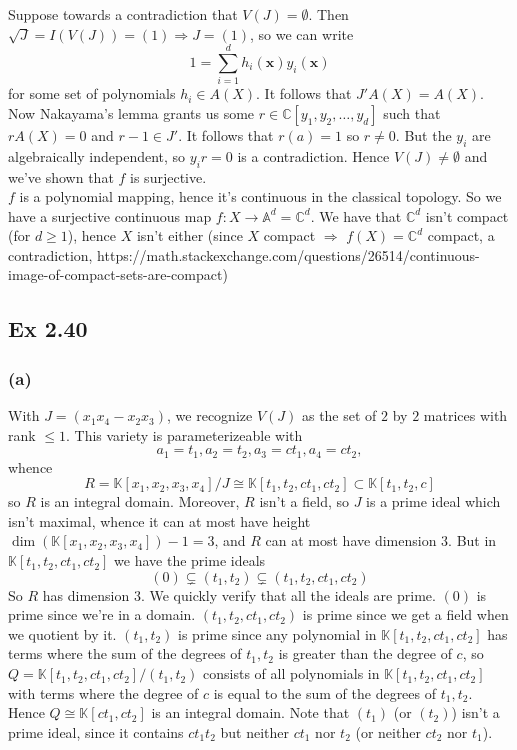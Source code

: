 \documentclass{article}
\theoremstyle{definition}
\newcommand{\C}{\mathbb{C}}
\newcommand{\K}{\mathbb{K}}
\newcommand{\A}{\mathbb{A}}
\newcommand{\x}{\bm{x}}
\begin{document}
Suppose towards a contradiction that $V(J) = \emptyset$. Then $\sqrt{J} =
I(V(J)) = (1) \Rightarrow J = (1)$, so we can write 
\[
	1 = \sum_{i = 1}^{d} h_i(\x)y_i(\x)
\] 
for some set of polynomials $h_i \in A(X)$. It follows that $J'A(X) = A(X)$.
Now Nakayama's lemma grants us some $r \in \C[y_1, y_2, \ldots, y_d]$ such that
$rA(X) = 0$ and $r - 1 \in J'$. It follows that $r(a) = 1$ so $r \not = 0$. But
the $y_i$ are algebraically independent, so $y_i r = 0$ is a contradiction.
Hence $V(J) \not = \emptyset$ and we've shown that $f$ is surjective. \\

$f$ is a polynomial mapping, hence it's continuous in the classical topology.
So we have a surjective continuous map $f: X \to \A^{d} = \C^{d}$. We have that
$\C^{d}$ isn't compact (for $d \geq 1$), hence $X$ isn't either (since $X$
compact $\Rightarrow$ $f(X) = \C^{d}$ compact, a contradiction,
https://math.stackexchange.com/questions/26514/continuous-image-of-compact-sets-are-compact)


\subsection*{Ex 2.40} 

\subsubsection*{(a)} 

With $J = (x_1x_4 - x_2x_3)$, we recognize $V(J)$ as the set of $2$ by $2$
matrices with rank $\leq 1$. This variety is parameterizeable with 
\[
	a_1 = t_1, a_2 = t_2, a_3 = c t_1, a_4 = c t_2,
\] 
whence
\[
	R = \K[x_1, x_2, x_3, x_4]/J \cong \K[t_1, t_2, ct_1, ct_2] \subset \K[t_1, t_2, c]
\] 
so $R$ is an integral domain. Moreover, $R$ isn't a field, so $J$ is a prime
ideal which isn't maximal, whence it can at most have height $\dim(\K[x_1, x_2,
x_3, x_4]) - 1 = 3$, and $R$ can at most have dimension $3$. But in $\K[t_1,
t_2, ct_1, ct_2]$ we have the prime ideals 
\[
	(0) \subsetneq (t_1, t_2) \subsetneq (t_1, t_2, ct_1, ct_2)
\] 
So $R$ has dimension $3$. We quickly verify that all the ideals are prime.
$(0)$ is prime since we're in a domain. $(t_1, t_2, ct_1, ct_2)$ is prime since
we get a field when we quotient by it. $(t_1, t_2)$ is prime since any
polynomial in $\K[t_1, t_2, ct_1, ct_2]$ has terms where the sum of the degrees
of $t_1, t_2$ is greater than the degree of $c$, so $Q = \K[t_1, t_2, ct_1,
ct_2]/(t_1, t_2)$ consists of all polynomials in $\K[t_1, t_2, ct_1, ct_2]$
with terms where the degree of $c$ is equal to the sum of the degrees of $t_1,
t_2$. Hence $Q \cong \K[ct_1, ct_2]$ is an integral domain. Note that $(t_1)$
(or $(t_{2})$) isn't a prime ideal, since it contains $ct_1t_2$ but neither
$ct_1$ nor $t_2$ (or neither $ct_2$ nor $t_1$).
\end{document}
